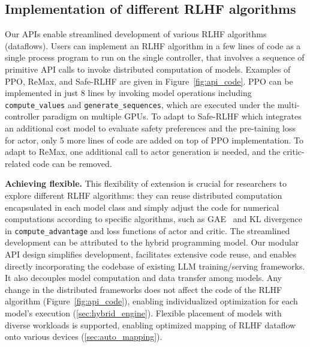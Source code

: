 \subsection{%
Implementation of different RLHF algorithms} \label{sec:examples_of_RLHF_dataflow}

Our APIs %
enable streamlined development of various RLHF algorithms (dataflows). 
Users can implement an RLHF algorithm in a few lines of code as a single process program to run on the single controller,
that involves a sequence of primitive API calls to invoke distributed computation of models. 
Examples of PPO, ReMax, and Safe-RLHF are given in Figure~\ref{fig:api_code}. PPO can be implemented in just 8 lines by invoking model operations
including \texttt{compute\_values} and \texttt{generate\_sequences}, which are executed under the multi-controller paradigm on multiple GPUs.
To adapt to Safe-RLHF which integrates an additional cost model to evaluate safety preferences and %
the pre-taining loss for actor, only 5 more lines of code are added on top of PPO implementation.
{To adapt to ReMax, one additional call to actor generation is needed, and the critic-related code can be removed.}

\noindent \textbf{Achieving flexible.}
This flexibility of extension is crucial for researchers to explore different RLHF algorithms: they can reuse distributed computation encapsulated in each model class and 
simply adjust the code for numerical computations according to specific algorithms, such as GAE~\cite{schulman2018highdimensional} and KL divergence in \verb|compute_advantage| and loss functions of actor and critic.
The streamlined development can be attributed to %
the hybrid programming model.
Our modular API design simplifies development, facilitates extensive code reuse, %
and enables directly incorporating the codebase of existing LLM training/serving frameworks. 
It also decouples model computation and data transfer among models. 
Any change in the distributed frameworks does not affect the code of the RLHF algorithm (Figure~\ref{fig:api_code}), enabling individualized optimization for each model's execution (\textsection\ref{sec:hybrid_engine}).
Flexible placement of models with diverse workloads is supported, %
enabling optimized mapping of RLHF dataflow onto various devices (\textsection\ref{sec:auto_mapping}).









